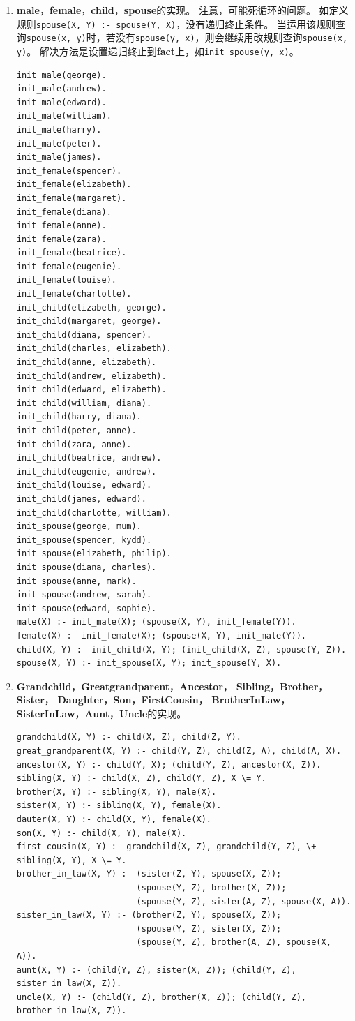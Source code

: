 ﻿\documentclass[a4paper, 11pt]{article}
\begin{document}
\begin{enumerate}
\item \textbf{male}，\textbf{female}，\textbf{child}，\textbf{spouse}的实现。
注意，可能死循环的问题。
如定义规则\texttt{spouse(X, Y) :- spouse(Y, X)}，没有递归终止条件。
当运用该规则查询\texttt{spouse(x, y)}时，若没有\texttt{spouse(y, x)}，则会继续用改规则查询\texttt{spouse(x, y)}。
解决方法是设置递归终止到\textbf{fact}上，如\texttt{init\_spouse(y, x)}。
\begin{lstlisting}
init_male(george).
init_male(andrew).
init_male(edward).
init_male(william).
init_male(harry).
init_male(peter).
init_male(james).
init_female(spencer).
init_female(elizabeth).
init_female(margaret).
init_female(diana).
init_female(anne).
init_female(zara).
init_female(beatrice).
init_female(eugenie).
init_female(louise).
init_female(charlotte).
init_child(elizabeth, george).
init_child(margaret, george).
init_child(diana, spencer).
init_child(charles, elizabeth).
init_child(anne, elizabeth).
init_child(andrew, elizabeth).
init_child(edward, elizabeth).
init_child(william, diana).
init_child(harry, diana).
init_child(peter, anne).
init_child(zara, anne).
init_child(beatrice, andrew).
init_child(eugenie, andrew).
init_child(louise, edward).
init_child(james, edward).
init_child(charlotte, william).
init_spouse(george, mum).
init_spouse(spencer, kydd).
init_spouse(elizabeth, philip).
init_spouse(diana, charles).
init_spouse(anne, mark).
init_spouse(andrew, sarah).
init_spouse(edward, sophie).
male(X) :- init_male(X); (spouse(X, Y), init_female(Y)).
female(X) :- init_female(X); (spouse(X, Y), init_male(Y)).
child(X, Y) :- init_child(X, Y); (init_child(X, Z), spouse(Y, Z)).
spouse(X, Y) :- init_spouse(X, Y); init_spouse(Y, X).
\end{lstlisting}

\item \textbf{Grandchild}，\textbf{Greatgrandparent}，\textbf{Ancestor}，
\textbf{Sibling}，\textbf{Brother}，\textbf{Sister}，
\textbf{Daughter}，\textbf{Son}，\textbf{FirstCousin}，
\textbf{BrotherInLaw}，\textbf{SisterInLaw}，\textbf{Aunt}，\textbf{Uncle}的实现。
\begin{lstlisting}
grandchild(X, Y) :- child(X, Z), child(Z, Y).
great_grandparent(X, Y) :- child(Y, Z), child(Z, A), child(A, X).
ancestor(X, Y) :- child(Y, X); (child(Y, Z), ancestor(X, Z)).
sibling(X, Y) :- child(X, Z), child(Y, Z), X \= Y.
brother(X, Y) :- sibling(X, Y), male(X).
sister(X, Y) :- sibling(X, Y), female(X).
dauter(X, Y) :- child(X, Y), female(X).
son(X, Y) :- child(X, Y), male(X).
first_cousin(X, Y) :- grandchild(X, Z), grandchild(Y, Z), \+ sibling(X, Y), X \= Y.
brother_in_law(X, Y) :- (sister(Z, Y), spouse(X, Z));
                        (spouse(Y, Z), brother(X, Z));
                        (spouse(Y, Z), sister(A, Z), spouse(X, A)).
sister_in_law(X, Y) :- (brother(Z, Y), spouse(X, Z));
                        (spouse(Y, Z), sister(X, Z));
                        (spouse(Y, Z), brother(A, Z), spouse(X, A)).
aunt(X, Y) :- (child(Y, Z), sister(X, Z)); (child(Y, Z), sister_in_law(X, Z)).
uncle(X, Y) :- (child(Y, Z), brother(X, Z)); (child(Y, Z), brother_in_law(X, Z)).
\end{lstlisting}


\end{enumerate}
\end{document}

